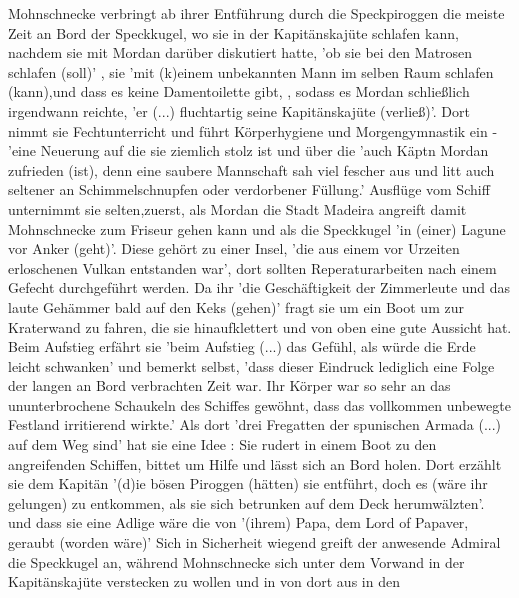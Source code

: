 {Mohnschnecke verbringt ab ihrer Entführung durch die Speckpiroggen \cite[S.32]{pir} die meiste Zeit an Bord der Speckkugel, wo sie in der Kapitänskajüte schlafen kann, nachdem sie mit Mordan darüber diskutiert hatte, 'ob sie bei den Matrosen schlafen (soll)' \cite[S.78]{pir}, sie 'mit (k)einem unbekannten Mann im selben Raum schlafen (kann),\cite[S.78]{pir}und dass es keine Damentoilette gibt, \cite[S.78]{pir}, sodass es Mordan schließlich irgendwann reichte, \cite[S.78]{pir} 'er (...) fluchtartig seine Kapitänskajüte (verließ)'.\cite[S.78]{pir} Dort nimmt sie Fechtunterricht \cite[S.127f]{pir} und führt Körperhygiene und Morgengymnastik ein - 'eine Neuerung auf die sie ziemlich stolz ist \cite[S.181]{pir} und über die 'auch Käptn Mordan zufrieden (ist), denn eine saubere Mannschaft sah viel fescher aus und litt auch seltener an Schimmelschnupfen oder verdorbener Füllung.'\cite[S.181]{pir} Ausflüge vom Schiff unternimmt sie selten,zuerst, als Mordan die Stadt Madeira angreift \cite[S.186ff]{pir} damit Mohnschnecke zum Friseur gehen kann \cite[S.195]{pir} und als die Speckkugel 'in (einer) Lagune vor Anker (geht)'.\cite[S.247]{pir} Diese gehört zu einer Insel, 'die aus einem vor Urzeiten erloschenen Vulkan entstanden war',\cite[S.246]{pir} dort sollten Reperaturarbeiten nach einem Gefecht durchgeführt werden.\cite[S.245f]{pir} Da ihr 'die Geschäftigkeit der Zimmerleute und das laute Gehämmer bald auf den Keks (gehen)'\cite[S.247]{pir} fragt sie um ein Boot um zur Kraterwand zu fahren, die sie hinaufklettert und von oben eine gute Aussicht hat. \cite[S.247f]{pir} Beim Aufstieg erfährt sie 'beim Aufstieg (...) das Gefühl, als würde die Erde leicht schwanken'\cite[S.248]{pir} und bemerkt selbst, 'dass dieser Eindruck lediglich eine Folge der langen an Bord verbrachten Zeit war. Ihr Körper war so sehr an das ununterbrochene Schaukeln des Schiffes gewöhnt, dass das vollkommen unbewegte Festland irritierend wirkte.'\cite[S.248]{pir} Als dort 'drei Fregatten der spunischen Armada (...) auf dem Weg sind'\cite[S.250]{pir} hat sie eine Idee \cite[S.251]{pir}: Sie rudert in einem Boot zu den angreifenden Schiffen, bittet um Hilfe und lässt sich an Bord holen. Dort erzählt sie dem Kapitän '(d)ie bösen Piroggen (hätten) sie entführt, doch es (wäre ihr gelungen) zu entkommen, als sie sich betrunken auf dem Deck herumwälzten'.\cite[S.254]{pir} und dass sie eine Adlige wäre die von '(ihrem) Papa, dem Lord of Papaver, geraubt (worden wäre)'\cite[S.255]{pir} Sich in Sicherheit wiegend greift der anwesende Admiral die Speckkugel an, während Mohnschnecke sich unter dem Vorwand in der Kapitänskajüte verstecken zu wollen und in von dort aus in den 

}
